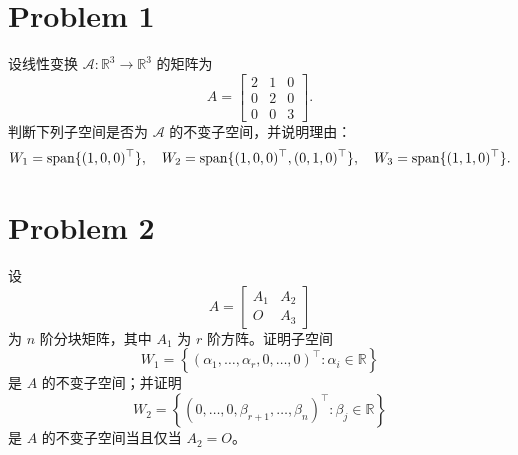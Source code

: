 \section*{Problem 1}

设线性变换 $\mathcal{A} : \mathbb{R}^3 \to \mathbb{R}^3$ 的矩阵为
\[
A =
\begin{bmatrix}
2 & 1 & 0 \\
0 & 2 & 0 \\
0 & 0 & 3
\end{bmatrix}.
\]
判断下列子空间是否为 $\mathcal{A}$ 的不变子空间，并说明理由：
\[
W_1 = \mathrm{span}\{(1,0,0)^\top\},\quad
W_2 = \mathrm{span}\{(1,0,0)^\top,(0,1,0)^\top\},\quad
W_3 = \mathrm{span}\{(1,1,0)^\top\}.
\]

\section*{Problem 2}

设
\[
A =
\begin{bmatrix}
A_1 & A_2 \\
O & A_3
\end{bmatrix}
\]
为 $n$ 阶分块矩阵，其中 $A_1$ 为 $r$ 阶方阵。证明子空间
\[
W_1 = \left\{\left(\alpha_1,\ldots,\alpha_r,0,\ldots,0\right)^\top : \alpha_i \in \mathbb{R}\right\}
\]
是 $A$ 的不变子空间；并证明
\[
W_2 = \left\{\left(0,\ldots,0,\beta_{r+1},\ldots,\beta_n\right)^\top : \beta_j \in \mathbb{R}\right\}
\]
是 $A$ 的不变子空间当且仅当 $A_2 = O$。
